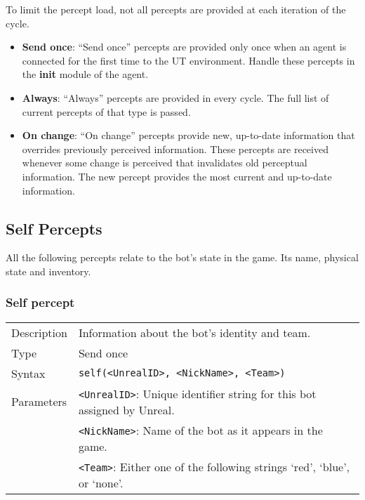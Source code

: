\documentclass[11pt,a4paper]{article}
\begin{document}
To limit the percept load, not all percepts are provided at each iteration of the cycle. 
\begin{itemize}
\item \textbf{Send once}: ``Send once'' percepts are provided only once when an agent is connected for the first time to the UT environment. Handle these percepts in the \textbf{init} module of the agent.
\item \textbf{Always}: ``Always'' percepts are provided in every cycle. The full list of current percepts of that type is passed.

\item \textbf{On change}: ``On change'' percepts provide new, up-to-date information that overrides previously perceived information. These percepts are received whenever some change is perceived that invalidates old perceptual information. The new percept provides the most current and up-to-date information.
\end{itemize}

%
\subsection{Self Percepts}
%
All the following percepts relate to the bot's state in the game. Its name, physical state and inventory.

\subsubsection*{Self percept}
\begin{small}
\begin{tabular}{p{2cm}p{9cm}}
Description & Information about the bot's identity and team.\\
Type & Send once\\
Syntax & \verb|self(<UnrealID>, <NickName>, <Team>)|\\ 
Parameters &
\verb|<UnrealID>|: Unique identifier string for this bot assigned by Unreal.\\
& \verb|<NickName>|: Name of the bot as it appears in the game.\\
& \verb|<Team>|: Either one of the following strings ‘red’, ‘blue’, or ‘none’.
\end{tabular}
\end{small}
\end{document}
